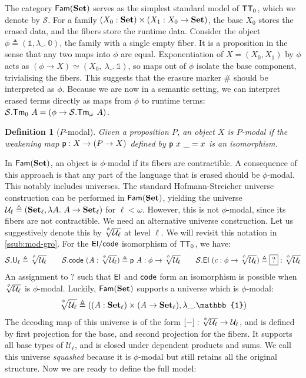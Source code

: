 \documentclass[10pt,a4paper]{article}
\newtheorem{definition}[theorem]{Definition}
\theoremstyle{definition}
\theoremstyle{remark}
\newcommand{\s}[1]{{\ensuremath{\textsf{\upshape #1}}}\xspace}
\newcommand{\cl}[1]{{\ensuremath{\mathcal{#1}}}\xspace}
\newcommand{\std}[1]{\ensuremath{\mathbb{#1}}\xspace}
\newcommand{\mth}[1]{\ensuremath{\textbf{\upshape #1}}\xspace}
\newcommand{\Set}{\mth{Set}}
\newcommand{\Tm}{\s{Tm}}
\newcommand{\univ}{\cl{U}}
\newcommand{\ZTT}{\ensuremath{\s{TT}_0}\xspace}
\newcommand{\amazing}[2]{\sqrt[\uproot{4}{#1}]{#2}}
\begin{document}
The category $\s{Fam}(\Set)$ serves as the simplest standard model of \ZTT,
which we denote by $\cl S$. For a family $(X_0 : \Set) \times (X_1 : X_0
\to \Set)$, the base $X_0$ stores the erased data, and the fibers store the
runtime data. Consider the object $\phi \triangleq (\std{1}, \lambda\_.\
\std{0})$, the family with a single empty fiber. It is a proposition in the
sense that any two maps into $\phi$ are equal. Exponentiation of $X = (X_0,
X_1)$ by $\phi$ acts as $(\phi \to X) \simeq (X_0,\ \lambda\_.\ \std{1})$, so
maps out of $\phi$ isolate the base component, trivialising the fibers. This
suggests that the erasure marker $\#$ should be interpreted as $\phi$. Because
we are now in a semantic setting, we can interpret erased terms directly as
maps from $\phi$ to runtime terms: $\cl S.\Tm_0\ A = (\phi \to \cl S.\Tm_\omega\ A)$.

\begin{definition}[$P$-modal]\label{def:phi-modal}
  Given a proposition $P$, an object $X$ is \emph{$P$-modal} if the
  weakening map $\s p : X \to (P \to X)$ defined by $\s p\ x\ \_ = x$
  is an isomorphism.
\end{definition}

In $\s{Fam}(\Set)$, an object is $\phi$-modal if its fibers are contractible. A
consequence of this approach is that any part of the language that is erased
should be $\phi$-modal. This notably includes universes. The standard
Hofmann-Streicher \cite{Hofmann1997-pt} universe construction can be performed
in $\s{Fam}(\Set)$, yielding the universe $\univ_\ell \triangleq (\Set_\ell,
\lambda A.\ A \to \Set_\ell)$ for $\ell < \omega$. However, this is not
$\phi$-modal, since its fibers are not contractible. We need an alternative
universe construction. Let us suggestively denote this by
$\amazing{\phi}{\univ_\ell}$ at level $\ell$. We will revisit this notation in
\cref{ssub:mod-gro}. For the $\s{El}/\s{code}$ isomorphism of \ZTT, we have:
\[
  \cl S.\s U_\ell \triangleq \amazing{\phi}{\univ_\ell} \qquad
  \cl S.\s{code}\ (A :  \amazing{\phi}{\univ_\ell}) \triangleq \s{p}\ A : \phi \to  \amazing{\phi}{\univ_\ell}  \qquad
  \cl S.\s{El}\ (c : \phi \to  \amazing{\phi}{\univ_\ell}) \triangleq \boxed{?} : \amazing{\phi}{\univ_\ell} 
\]
An assignment to $\boxed{?}$ such that $\s{El}$ and $\s{code}$ form an isomorphism
is possible when $\amazing{\phi}{\univ_\ell}$ is $\phi$-modal.
Luckily, $\s{Fam}(\Set)$ supports a universe which is $\phi$-modal:
\[
  \amazing{\phi}{\univ_\ell} \triangleq ((A : \Set_\ell) \times (A \to \Set_\ell), \lambda\_.\std 1)
\]
The decoding map of this universe is of the form $[-] :
\amazing{\phi}{\univ_\ell} \to \univ_\ell$, and is defined by first projection
for the base, and second projection for the fibers. It supports all base types
of $\univ_\ell$, and is closed under dependent products and sums. We call this
universe \emph{squashed} because it is $\phi$-modal but still retains all the
original structure. Now we are ready to define the full model:
\end{document}
